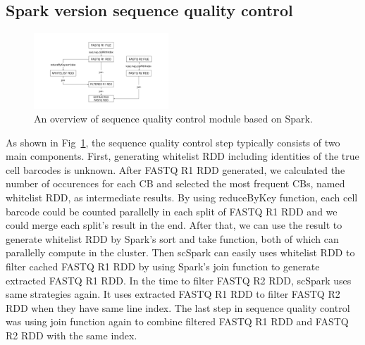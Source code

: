 \documentclass[conference]{IEEEtran}
\begin{document}
\subsection{Spark version sequence quality control}
\begin{figure}
	\includegraphics[width=0.45\textwidth]{Fig1.pdf}
	\caption{An overview of sequence quality control module based on Spark.} \label{fig1}
\end{figure}
As shown in Fig~\ref{fig1}, the sequence quality control step typically consists of two main components.
First, generating whitelist RDD including identities of the true cell barcodes is unknown.
After FASTQ R1 RDD generated, we calculated the number of occurences for each CB and selected the most frequent CBs, named whitelist RDD, as intermediate results. 
By using reduceByKey function, each cell barcode could be counted parallelly in each split of FASTQ R1 RDD and we could merge each split's result in the end. 
After that, we can use the result to generate whitelist RDD by Spark's sort and take function, both of which can parallelly compute in the cluster.
Then scSpark can easily uses whitelist RDD to filter cached FASTQ R1 RDD by using Spark's join function to generate extracted FASTQ R1 RDD.
In the time to filter FASTQ R2 RDD, scSpark uses same strategies again. 
It uses extracted FASTQ R1 RDD to filter FASTQ R2 RDD when they have same line index.
The last step in sequence quality control was using join function again to combine filtered FASTQ R1 RDD and FASTQ R2 RDD with the same index. 
\end{document}
